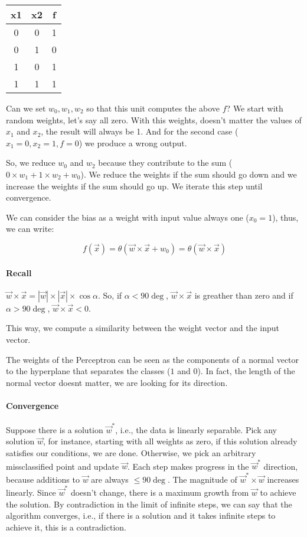 \documentclass[main]{subfiles}
\begin{document}
\begin{table}[H]
\begin{tabular}{cc|c}
x1 & x2 & f \\ 
\hline
0  & 0  & 1 \\
0  & 1  & 0 \\
1  & 0  & 1 \\
1  & 1  & 1 \\ 
\end{tabular}
\end{table}

Can we set $w_0, w_1, w_2$ so that this unit computes the above $f$?
We start with random weights, let's say all zero. With this weights, doesn't matter the values of $x_1$ and $x_2$, the result will always be 1. And for the second case ($x_1 = 0, x_2 = 1, f = 0$) we produce a wrong output.

So, we reduce $w_0$ and $w_2$ because they contribute to the sum ($0 \times w_1 + 1 \times w_2 + w_0$). We reduce the weights if the sum should go down and we increase the weights if the sum should go up. We iterate this step until convergence.

We can consider the bias as a weight with input value always one ($x_0 = 1$), thus, we can write:

\[ f(\vec{x}) = \theta(\vec{w} \times \vec{x} + w_0) = \theta(\vec{w} \times \vec{x}) \]

\paragraph{Recall} $\vec{w} \times \vec{x} = |\vec{w}| \times |\vec{x}| \times \cos \alpha$.  So, if $\alpha < 90\deg$, $\vec{w} \times \vec{x}$ is greather than zero and if $\alpha > 90\deg$, $\vec{w} \times \vec{x} < 0$.

This way, we compute a similarity between the weight vector and the input vector.

The weights of the Perceptron can be seen as the components of a normal vector to the hyperplane that separates the classes ($1$ and $0$). In  fact, the  length of the normal vector doesnt matter, we are looking for its direction.

\paragraph{Convergence}
Suppose there is a solution $\vec{w}^*$, i.e., the data is linearly separable.
Pick any solution $\vec{w}$, for instance, starting with all weights as zero, if this solution already satisfies our conditions, we are done. Otherwise, we pick an arbitrary missclassified point and update $\vec{w}$. Each step makes progress in the $\vec{w}^*$ direction, because additions to $\vec{w}$ are always $\leq 90\deg$. The magnitude of $\vec{w}^* \times \vec{w}$ increases linearly. Since $\vec{w}^*$ doesn't change, there is a maximum growth from $\vec{w}$ to achieve the solution.
By contradiction in the limit of infinite steps, we can say that the algorithm converges, i.e., if there is a solution and it takes infinite steps to achieve it, this is a contradiction.
\end{document}
